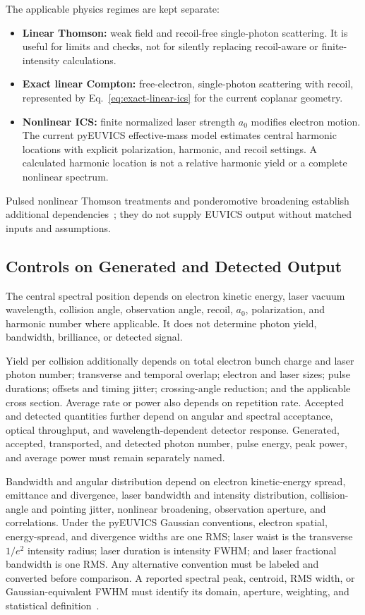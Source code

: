 The applicable physics regimes are kept separate:
\begin{itemize}
  \item \textbf{Linear Thomson:} weak field and recoil-free single-photon
        scattering. It is useful for limits and checks, not for silently
        replacing recoil-aware or finite-intensity calculations.
  \item \textbf{Exact linear Compton:} free-electron, single-photon scattering
        with recoil, represented by Eq.~\ref{eq:exact-linear-ics} for the current
        coplanar geometry.
  \item \textbf{Nonlinear ICS:} finite normalized laser strength $a_0$ modifies
        electron motion. The current pyEUVICS effective-mass model estimates
        central harmonic locations with explicit polarization, harmonic, and
        recoil settings. A calculated harmonic location is not a relative
        harmonic yield or a complete nonlinear spectrum.
\end{itemize}
Pulsed nonlinear Thomson treatments and ponderomotive broadening establish
additional dependencies~\cite{KrafftEtAl2005NonlinearThomson,HartemannWu2013Brightness};
they do not supply EUVICS output without matched inputs and assumptions.

\subsection{Controls on Generated and Detected Output}

The central spectral position depends on electron kinetic energy, laser vacuum
wavelength, collision angle, observation angle, recoil, $a_0$, polarization,
and harmonic number where applicable. It does not determine photon yield,
bandwidth, brilliance, or detected signal.

Yield per collision additionally depends on total electron bunch charge and
laser photon number; transverse and temporal overlap; electron and laser sizes;
pulse durations; offsets and timing jitter; crossing-angle reduction; and the
applicable cross section. Average rate or power also depends on repetition rate.
Accepted and detected quantities further depend on angular and spectral
acceptance, optical throughput, and wavelength-dependent detector response.
Generated, accepted, transported, and detected photon number, pulse energy,
peak power, and average power must remain separately named.

Bandwidth and angular distribution depend on electron kinetic-energy spread,
emittance and divergence, laser bandwidth and intensity distribution,
collision-angle and pointing jitter, nonlinear broadening, observation aperture,
and correlations. Under the pyEUVICS Gaussian conventions, electron spatial,
energy-spread, and divergence widths are one RMS; laser waist is the transverse
$1/e^2$ intensity radius; laser duration is intensity FWHM; and laser fractional
bandwidth is one RMS. Any alternative convention must be labeled and converted
before comparison. A reported spectral peak, centroid, RMS width, or
Gaussian-equivalent FWHM must identify its domain, aperture, weighting, and
statistical definition~\cite{pyEUVICSModels050}.


